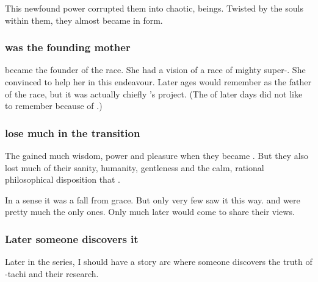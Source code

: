 This newfound power corrupted them into chaotic, \daemonic{} beings. Twisted by the \xzaishannic{} souls within them, they almost became \xzaishanns{} in \ophidian{} form. 





\subsubsection{\Tiamat was the founding mother}
\Tiamat became the founder of the \draconian race.
She had a vision of a race of mighty super-\ophidians.
She convinced \Sethicus to help her in this endeavour.
Later ages would remember \Sethicus as the father of the \draconian race, but it was actually chiefly \Tiamat's project.
(The \dragons of later days did not like to remember \Tiamat because of .)





\subsubsection{\Dragons lose much in the transition}
The \dragons gained much wisdom, power and pleasure when they became \dragons. 
But they also lost much of their sanity, humanity, gentleness and the calm, rational philosophical disposition that . 

In a sense it was a fall from grace. 
But only very few \dragons saw it this way. 
\Iurzmacul and \Nexagglachel were pretty much the only ones. 
Only much later would \Ishnaruchaefir come to share their views.





\subsubsection{Later someone discovers it}
Later in the series, I should have a story arc where someone discovers the truth of \Sethicus-tachi and their research. 

